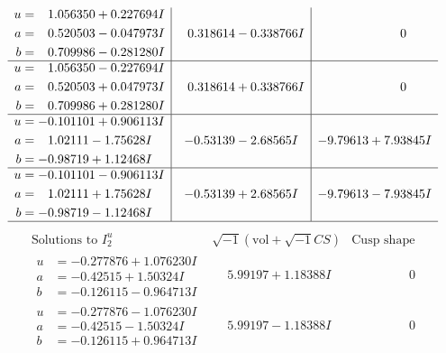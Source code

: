 \documentclass[1p]{elsarticle_modified}
\theoremstyle{definition}
\newcommand{\I}{\sqrt{-1}}
\begin{document}
$$\begin{array}{c|c|c}
\begin{aligned}
u &= \phantom{-}1.056350 + 0.227694 I \\
a &= \phantom{-}0.520503 - 0.047973 I \\
b &= \phantom{-}0.709986 - 0.281280 I\end{aligned}
 & \phantom{-}0.318614 - 0.338766 I & \phantom{-0.000000 } 0 \\ \hline\begin{aligned}
u &= \phantom{-}1.056350 - 0.227694 I \\
a &= \phantom{-}0.520503 + 0.047973 I \\
b &= \phantom{-}0.709986 + 0.281280 I\end{aligned}
 & \phantom{-}0.318614 + 0.338766 I & \phantom{-0.000000 } 0 \\ \hline\begin{aligned}
u &= -0.101101 + 0.906113 I \\
a &= \phantom{-}1.02111 - 1.75628 I \\
b &= -0.98719 + 1.12468 I\end{aligned}
 & -0.53139 - 2.68565 I & -9.79613 + 7.93845 I \\ \hline\begin{aligned}
u &= -0.101101 - 0.906113 I \\
a &= \phantom{-}1.02111 + 1.75628 I \\
b &= -0.98719 - 1.12468 I\end{aligned}
 & -0.53139 + 2.68565 I & -9.79613 - 7.93845 I\\
 \hline 
 \end{array}$$\newpage$$\begin{array}{c|c|c}  
\text{Solutions to }I^u_{2}& \I (\text{vol} + \sqrt{-1}CS) & \text{Cusp shape}\\
 \hline 
\begin{aligned}
u &= -0.277876 + 1.076230 I \\
a &= -0.42515 + 1.50324 I \\
b &= -0.126115 - 0.964713 I\end{aligned}
 & \phantom{-}5.99197 + 1.18388 I & \phantom{-0.000000 } 0 \\ \hline\begin{aligned}
u &= -0.277876 - 1.076230 I \\
a &= -0.42515 - 1.50324 I \\
b &= -0.126115 + 0.964713 I\end{aligned}
 & \phantom{-}5.99197 - 1.18388 I & \phantom{-0.000000 } 0 \\ \hline\begin{aligned}

\end{aligned}
\end{array}$$
\end{document}
